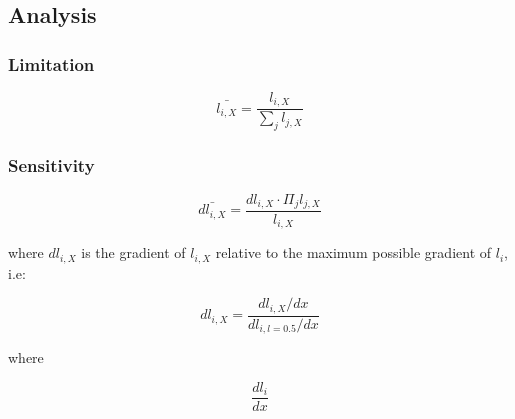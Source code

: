 \subsection{Analysis}


\subsubsection{Limitation}

\begin{equation}
    \bar{l_{i, X}} = \frac{l_{i, X}}{\sum_{j} l_{j, X}}
\end{equation}

\subsubsection{Sensitivity}

\begin{equation}
    \bar{dl_{i, X}} = \frac{dl_{i, X} \cdot \Pi_{j} l_{j, X}}{l_{i, X}}
\end{equation}

where $dl_{i, X}$ is the gradient of $l_{i, X}$ relative to the maximum possible gradient of $l_{i}$, i.e:

\begin{equation}
    dl_{i, X} = \frac{dl_{i, X} / dx}{dl_{i, l = 0.5} / dx}
\end{equation}

where

\begin{equation}
    \frac{dl_{i}}{dx}
\end{equation}
